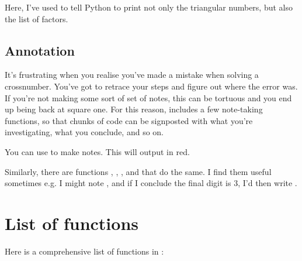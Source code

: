 \documentclass[letterpaper,10pt,english]{sphinxmanual}
\begin{document}
Here, I’ve used  to tell Python to print not only the triangular numbers, but also the list of factors.


\section{Annotation}
\label{\detokenize{index:annotation}}
It’s frustrating when you realise you’ve made a mistake when solving a crossnumber. You’ve got to retrace your steps and figure out where the error was. If you’re not making some sort of set of notes, this can be tortuous and you end up being back at square one. For this reason,  includes a few note-taking functions, so that chunks of code can be signposted with what you’re investigating, what you conclude, and so on.

You can use  to make notes. This will output  in red.

Similarly, there are functions , , , and  that do the same. I find them useful sometimes e.g. I might note , and if I conclude the final digit is 3, I’d then write .


\chapter{List of functions}
\label{\detokenize{index:list-of-functions}}
Here is a comprehensive list of functions in :
\end{document}
